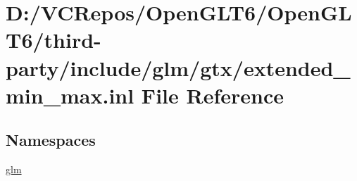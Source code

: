 \hypertarget{extended__min__max_8inl}{}\section{D\+:/\+V\+C\+Repos/\+Open\+G\+L\+T6/\+Open\+G\+L\+T6/third-\/party/include/glm/gtx/extended\+\_\+min\+\_\+max.inl File Reference}
\label{extended__min__max_8inl}
\subsection*{Namespaces}
\begin{DoxyCompactItemize}
\item 
 \mbox{\hyperlink{namespaceglm}{glm}}
\end{DoxyCompactItemize}
